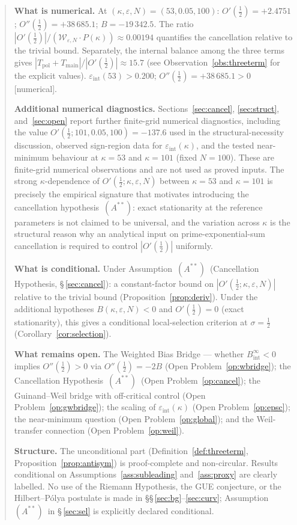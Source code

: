 \documentclass[11pt]{article}
\newcommand{\Astar}{\ensuremath{(A^{**})}}  %
\begin{document}
\begin{abstract}
\textbf{What is numerical.}
At $(\kappa,\varepsilon,N)=(53,0.05,100)$:
$O'(\tfrac12)=+2.4751$; $O''(\tfrac12)=+38\,685.1$; $B=-19\,342.5$.
The ratio
$|O'(\tfrac12)|/(\mathcal{W}_{\varepsilon,N}\cdot P(\kappa))\approx 0.00194$
quantifies the cancellation relative to the trivial bound.
Separately, the internal balance among the three terms gives
$|T_{\mathrm{pol}}+T_{\mathrm{main}}|/|O'(\tfrac12)|\approx 15.7$
(see Observation~\ref{obs:threeterm} for the explicit values).
$\varepsilon_{\mathrm{int}}(53)>0.200$; $O''(\tfrac12)=+38\,685.1>0$ [numerical].

\textbf{Additional numerical diagnostics.}
Sections~\ref{sec:cancel}, \ref{sec:struct}, and~\ref{sec:open}
report further finite-grid numerical diagnostics, including the value
$O'(\tfrac12;101,0.05,100)=-137.6$ used in the structural-necessity
discussion, observed sign-region data for
$\varepsilon_{\mathrm{int}}(\kappa)$, and the tested near-minimum
behaviour at $\kappa=53$ and $\kappa=101$ (fixed $N=100$).
These are finite-grid numerical observations and are not used as
proved inputs.
The strong $\kappa$-dependence of $O'(\tfrac12;\kappa,\varepsilon,N)$
between $\kappa=53$ and $\kappa=101$ is precisely the empirical signature
that motivates introducing the cancellation hypothesis~\Astar:
exact stationarity at the reference parameters is not claimed to be
universal, and the variation across $\kappa$ is the structural reason
why an analytical input on prime-exponential-sum cancellation is
required to control $|O'(\tfrac12)|$ uniformly.

\textbf{What is conditional.}
Under Assumption~\Astar\ (Cancellation Hypothesis, \S\,\ref{sec:cancel}):
a constant-factor bound on $|O'(\tfrac12;\kappa,\varepsilon,N)|$ relative
to the trivial bound (Proposition~\ref{prop:deriv}).
Under the additional hypotheses $B(\kappa,\varepsilon,N)<0$ and
$O'(\tfrac12)=0$ (exact stationarity), this gives a conditional
local-selection criterion at $\sigma=\tfrac12$
(Corollary~\ref{cor:selection}).

\textbf{What remains open.}
The Weighted Bias Bridge --- whether $B_{\mathrm{int}}^\infty<0$ implies
$O''(\tfrac12)>0$ via $O''(\tfrac12)=-2B$ (Open Problem~\ref{op:wbridge});
the Cancellation Hypothesis~\Astar\ (Open Problem~\ref{op:cancel});
the Guinand--Weil bridge with off-critical control
(Open Problem~\ref{op:gwbridge}); the scaling of $\varepsilon_{\mathrm{int}}(\kappa)$
(Open Problem~\ref{op:epsc}); the near-minimum question
(Open Problem~\ref{op:global}); and the Weil-transfer connection
(Open Problem~\ref{op:weil}).

\textbf{Structure.}
The unconditional part (Definition~\ref{def:threeterm}, Proposition~\ref{prop:antisym})
is proof-complete and non-circular.
Results conditional on Assumptions~\ref{ass:subleading}
and~\ref{ass:proxy} are clearly labelled.
No use of the Riemann Hypothesis, the GUE conjecture, or the
Hilbert--P\'olya postulate is made in \S\S\,\ref{sec:bg}--\ref{sec:curv};
Assumption~\Astar\ in \S\,\ref{sec:sel} is explicitly declared conditional.
\end{abstract}
\end{document}
